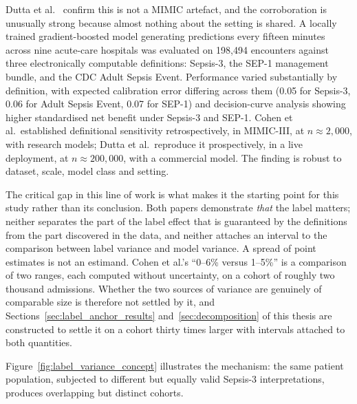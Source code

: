 Dutta et al.\ \cite{dutta2026performance} confirm this is not a MIMIC artefact,
and the corroboration is unusually strong because almost nothing about the
setting is shared. A locally trained gradient-boosted model generating
predictions every fifteen minutes across nine acute-care hospitals was
evaluated on 198,494 encounters against three electronically computable
definitions: Sepsis-3, the SEP-1 management bundle, and the CDC Adult Sepsis
Event. Performance varied substantially by definition, with expected
calibration error differing across them (0.05 for Sepsis-3, 0.06 for Adult
Sepsis Event, 0.07 for SEP-1) and decision-curve analysis showing higher
standardised net benefit under Sepsis-3 and SEP-1. Cohen et al.\ established
definitional sensitivity retrospectively, in MIMIC-III, at $n \approx 2{,}000$,
with research models; Dutta et al.\ reproduce it prospectively, in a live
deployment, at $n \approx 200{,}000$, with a commercial model. The finding is
robust to dataset, scale, model class and setting.

The critical gap in this line of work is what makes it the starting point for
this study rather than its conclusion. Both papers demonstrate \emph{that} the
label matters; neither separates the part of the label effect that is
guaranteed by the definitions from the part discovered in the data, and neither
attaches an interval to the comparison between label variance and model
variance. A spread of point estimates is not an estimand. Cohen et al.'s
``0--6\% versus 1--5\%'' is a comparison of two ranges, each computed without
uncertainty, on a cohort of roughly two thousand admissions. Whether the two
sources of variance are genuinely of comparable size is therefore not settled
by it, and Sections~\ref{sec:label_anchor_results} and~\ref{sec:decomposition}
of this thesis are constructed to settle it on a cohort thirty times larger
with intervals attached to both quantities.

Figure~\ref{fig:label_variance_concept} illustrates the mechanism: the same
patient population, subjected to different but equally valid Sepsis-3
interpretations, produces overlapping but distinct cohorts.


